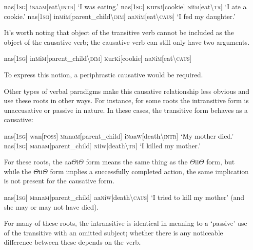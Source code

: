 \documentclass[a4paper,10pt,twoside,openright]{memoir}
\newcommand{\rootpart}{$\Theta$}
\newcommand{\famwordold}[5]{#1\textsc{#2}#3\textsc{#4}#5}
\begin{document}
\pex
\a
\begingl
nas[\textsc{1sg}]
\famwordold{i}{n}{aa}{m}{}[eat\textbackslash\textsc{intr}]
\glft `I was eating.'
\endgl
\a
\begingl
nas[\textsc{1sg}]
\famwordold{}{k}{ur}{k}{i}[cookie]
\famwordold{}{n}{ii}{m}{}[eat\textbackslash\textsc{tr}]
\glft `I ate a cookie.'
\endgl
\a
\begingl
nas[\textsc{1sg}]
\famwordold{in}{m}{i}{m}{}[parent\_child\textbackslash\textsc{dim}]
\famwordold{aa}{n}{i}{m}{}[eat\textbackslash\textsc{caus}]
\glft `I fed my daughter.'
\endgl
\xe

It's worth noting that object of the transitive verb cannot be included as the object of the causative verb; the causative verb can still only have two arguments.

\ex
\ljudge{*}
\begingl
nas[\textsc{1sg}]
\famwordold{in}{m}{i}{m}{}[parent\_child\textbackslash\textsc{dim}]
\famwordold{}{k}{ur}{k}{i}[cookie]
\famwordold{aa}{n}{i}{m}{}[eat\textbackslash\textsc{caus}]
\endgl
\xe

\noindent To express this notion, a periphrastic causative would be required.

Other types of verbal paradigms make this causative relationship less obvious and use these roots in other ways. For instance, for some roots the intransitive form is unaccusative or passive in nature. In these cases, the transitive form behaves as a causative:

\pex
\a
\begingl
nas[\textsc{1sg}]
wan[\textsc{poss}]
\famwordold{}{m}{ana}{m}{}[parent\_child]
\famwordold{i}{n}{aa}{w}{}[death\textbackslash\textsc{intr}]
\glft `My mother died.'
\endgl
\a
\begingl
nas[\textsc{1sg}]
\famwordold{}{m}{ana}{m}{}[parent\_child]
\famwordold{}{n}{ii}{w}{}[death\textbackslash\textsc{tr}]
\glft `I killed my mother.'
\endgl
\xe

For these roots, the aa{\rootpart}i{\rootpart} form means the same thing as the {\rootpart}ii{\rootpart} form, but while the {\rootpart}ii{\rootpart} form implies a successfully completed action, the same implication is not present for the causative form.

\ex
\begingl
nas[\textsc{1sg}]
\famwordold{}{m}{ana}{m}{}[parent\_child]
\famwordold{aa}{n}{i}{w}{}[death\textbackslash\textsc{caus}]
\glft `I tried to kill my mother' (and she may or may not have died).
\endgl
\xe

\noindent For many of these roots, the intransitive is identical in meaning to a `passive' use of the transitive with an omitted subject; whether there is any noticeable difference between these depends on the verb.
\end{document}
